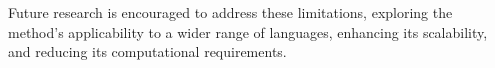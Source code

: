 \documentclass[11pt]{article}
\begin{document}
\begin{CJK*}{UTF8}{gbsn}
Future research is encouraged to address these limitations, exploring the method's applicability to a wider range of languages, enhancing its scalability, and reducing its computational requirements.








\end{CJK*}
\end{document}
